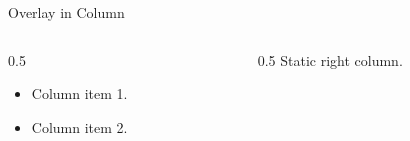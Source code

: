 \documentclass[14pt,t]{beamer-accessibility}
\begin{document}
\begin{frame}{Overlay in Column}
\begin{columns}[T]
\begin{column}{0.5\textwidth}
\begin{itemize}
\item<1-> Column item 1.
\item<2-> Column item 2.
\end{itemize}
\end{column}
\begin{column}{0.5\textwidth}
Static right column.
\end{column}
\end{columns}
\end{frame}
\end{document}
